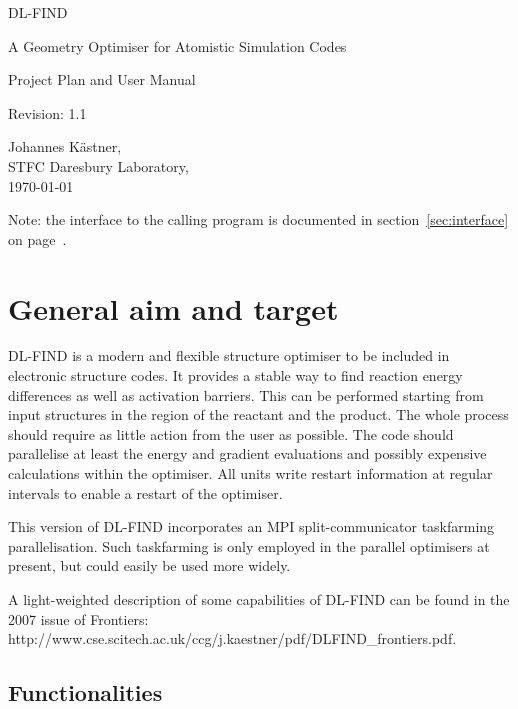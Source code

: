 \documentclass{article}
\begin{document}
\begin{center}
\LARGE
DL-FIND

\Large
A Geometry Optimiser for Atomistic Simulation Codes

\bigskip
\LARGE
Project Plan and User Manual

\bigskip
\normalsize    
$ $Revision: 1.1 $ $
 
Johannes K\"astner, \\
STFC Daresbury Laboratory,\\
\today
\end{center}

Note: the interface to the calling program is documented in
section~\ref{sec:interface} on page~\pageref{sec:interface}.

\section{General aim and target}

DL-FIND is a modern and flexible structure optimiser to be included in
electronic structure codes. It provides a stable way to find reaction energy
differences as well as activation barriers. This can be performed starting
from input structures in the region of the reactant and the product.  The
whole process should require as little action from the user as possible.  The
code should parallelise at least the energy and gradient evaluations and
possibly expensive calculations within the optimiser. All units write restart
information at regular intervals to enable a restart of the optimiser.

This version of DL-FIND incorporates an MPI split-communicator taskfarming 
parallelisation.  
Such taskfarming is only employed in the parallel optimisers at present, but 
could easily be used more widely.

A light-weighted description of some capabilities of DL-FIND can be found in
the 2007 issue of Frontiers:\\
http://www.cse.scitech.ac.uk/ccg/j.kaestner/pdf/DLFIND\_frontiers.pdf.

\subsection{Functionalities}
\end{document}
